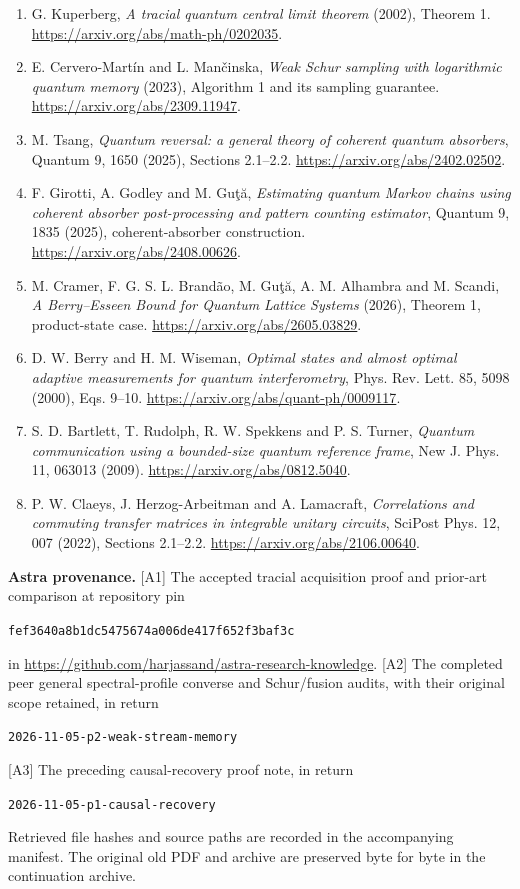 \begin{enumerate}
\item G. Kuperberg, \emph{A tracial quantum central limit theorem} (2002),
Theorem 1. \url{https://arxiv.org/abs/math-ph/0202035}.
\item E. Cervero-Mart\'in and L. Man\v{c}inska,
\emph{Weak Schur sampling with logarithmic quantum memory} (2023),
Algorithm 1 and its sampling guarantee.
\url{https://arxiv.org/abs/2309.11947}.
\item M. Tsang, \emph{Quantum reversal: a general theory of coherent quantum
absorbers}, Quantum 9, 1650 (2025), Sections 2.1--2.2.
\url{https://arxiv.org/abs/2402.02502}.
\item F. Girotti, A. Godley and M. Gu\c{t}\u{a},
\emph{Estimating quantum Markov chains using coherent absorber
post-processing and pattern counting estimator}, Quantum 9, 1835 (2025),
coherent-absorber construction.
\url{https://arxiv.org/abs/2408.00626}.
\item M. Cramer, F. G. S. L. Brand\~ao, M. Gu\c{t}\u{a}, A. M. Alhambra
and M. Scandi, \emph{A Berry--Esseen Bound for Quantum Lattice Systems}
(2026), Theorem 1, product-state case.
\url{https://arxiv.org/abs/2605.03829}.
\item D. W. Berry and H. M. Wiseman, \emph{Optimal states and almost optimal
adaptive measurements for quantum interferometry}, Phys. Rev. Lett. 85,
5098 (2000), Eqs. 9--10.
\url{https://arxiv.org/abs/quant-ph/0009117}.
\item S. D. Bartlett, T. Rudolph, R. W. Spekkens and P. S. Turner,
\emph{Quantum communication using a bounded-size quantum reference frame},
New J. Phys. 11, 063013 (2009).
\url{https://arxiv.org/abs/0812.5040}.
\item P. W. Claeys, J. Herzog-Arbeitman and A. Lamacraft,
\emph{Correlations and commuting transfer matrices in integrable unitary
circuits}, SciPost Phys. 12, 007 (2022), Sections 2.1--2.2.
\url{https://arxiv.org/abs/2106.00640}.
\end{enumerate}

\textbf{Astra provenance.} [A1] The accepted tracial acquisition proof and
prior-art comparison at repository pin
\begin{center}\texttt{fef3640a8b1dc5475674a006de417f652f3baf3c}\end{center}
in
\url{https://github.com/harjassand/astra-research-knowledge}.
[A2] The completed peer general spectral-profile converse and Schur/fusion
audits, with their original scope retained, in return
\begin{center}\texttt{2026-11-05-p2-weak-stream-memory}\end{center}
[A3] The preceding causal-recovery proof note, in return
\begin{center}\texttt{2026-11-05-p1-causal-recovery}\end{center}
Retrieved file hashes and source paths
are recorded in the accompanying manifest. The original old PDF and archive
are preserved byte for byte in the continuation archive.
